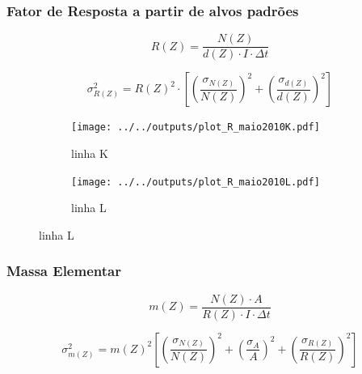 \begin{frame}
  \frametitle{Fator de Resposta a partir de alvos padrões}
  \begin{footnotesize}
  \begin{equation*}
    R(Z) = \frac{N(Z)}{d(Z) \cdot I \cdot \Delta t}
  \end{equation*}
    
  \begin{equation*}
  \sigma_{R(Z)}^2 = {R(Z)}^2 \cdot \left[ \left(\frac{\sigma_{N(Z)}}{N(Z)}\right)^2 + 
  \left(\frac{\sigma_{d(Z)}}{d(Z)}\right)^2 
  \right]
  \end{equation*}
\end{footnotesize}  
  \begin{figure}[H]
  	\begin{subfigure}[b]{0.4\textwidth}
  		\texttt{[image: ../../outputs/plot\_R\_maio2010K.pdf]}
  		\caption{linha K}
  	\end{subfigure}%
  	\begin{subfigure}[b]{0.4\textwidth}
  		\texttt{[image: ../../outputs/plot\_R\_maio2010L.pdf]}
  		\caption{linha L}
  	\end{subfigure}
  \end{figure}
\end{frame}

\begin{frame}
  \frametitle{Massa Elementar}
\begin{equation*}
  \label{eq:xrfedmassa}
  m(Z) = \frac{N(Z) \cdot A}{ R(Z) \cdot I \cdot \Delta t}
\end{equation*}

\begin{equation*}
  \label{eq:erro_massa}
  \sigma_{m(Z)}^2 = {m(Z)}^2 \left[ \left(\frac{\sigma_{N(Z)}}{N(Z)}\right)^2 + 
                                  \left(\frac{\sigma_A}{A}\right)^2 + 
                                  \left(\frac{\sigma_{R(Z)}}{R(Z)}\right)^2 
                             \right]
\end{equation*}
\end{frame}

